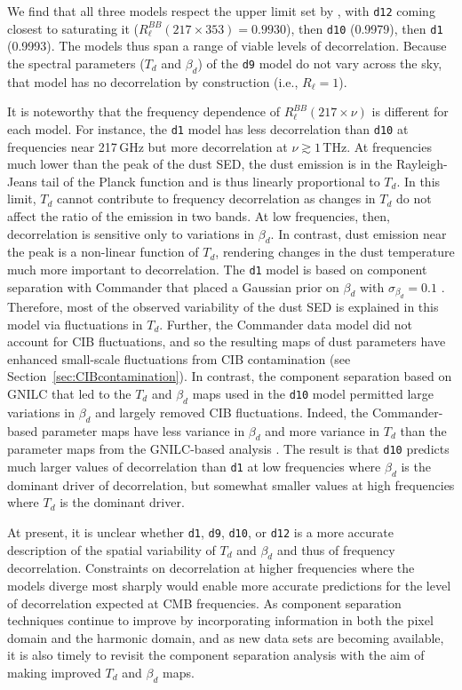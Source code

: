 \documentclass[twocolumn]{aastex631}
\begin{document}
We find that all three models respect the upper limit set by \citet{planck2016-l11A}, with \texttt{d12} coming closest to saturating it ($R_\ell^{BB}(217\times353) = 0.9930$), then \texttt{d10} (0.9979), then \texttt{d1} (0.9993). The models thus span a range of viable levels of decorrelation. Because the spectral parameters ($T_d$ and $\beta_d$) of the \texttt{d9} model do not vary across the sky, that model has no decorrelation by construction (i.e., $R_\ell = 1$).

It is noteworthy that the frequency dependence of $R_\ell^{BB}(217\times\nu)$ is different for each model. For instance, the \texttt{d1} model has less decorrelation than \texttt{d10} at frequencies near 217\,GHz but more decorrelation at $\nu \gtrsim 1$\,THz. At frequencies much lower than the peak of the dust SED, the dust emission is in the Rayleigh-Jeans tail of the Planck function and is thus linearly proportional to $T_d$. In this limit, $T_d$ cannot contribute to frequency decorrelation as changes in $T_d$ do not affect the ratio of the emission in two bands. At low frequencies, then, decorrelation is sensitive only to variations in $\beta_d$. In contrast, dust emission near the peak is a non-linear function of $T_d$, rendering changes in the dust temperature much more important to decorrelation. The \texttt{d1} model is based on component separation with Commander that placed a Gaussian prior on $\beta_d$ with $\sigma_{\beta_d} = 0.1$ \citep{planck2014-a12}. Therefore, most of the observed variability of the dust SED is explained in this model via fluctuations in $T_d$. Further, the Commander data model did not account for CIB fluctuations, and so the resulting maps of dust parameters have enhanced small-scale fluctuations from CIB contamination (see Section~\ref{sec:CIBcontamination}). In contrast, the component separation based on GNILC that led to the $T_d$ and $\beta_d$ maps used in the \texttt{d10} model \citep{planck2016-XLVIII} permitted large variations in $\beta_d$ and largely removed CIB fluctuations. Indeed, the Commander-based parameter maps have less variance in $\beta_d$ and more variance in $T_d$ than the parameter maps from the GNILC-based analysis \citep[see][Table~1]{planck2016-XLVIII}. The result is that \texttt{d10} predicts much larger values of decorrelation than \texttt{d1} at low frequencies where $\beta_d$ is the dominant driver of decorrelation, but somewhat smaller values at high frequencies where $T_d$ is the dominant driver.

At present, it is unclear whether \texttt{d1}, \texttt{d9}, \texttt{d10}, or \texttt{d12} is a more accurate description of the spatial variability of $T_d$ and $\beta_d$ and thus of frequency decorrelation. Constraints on decorrelation at higher frequencies where the models diverge most sharply would enable more accurate predictions for the level of decorrelation expected at CMB frequencies. As component separation techniques continue to improve by incorporating information in both the pixel domain and the harmonic domain, and as new data sets are becoming available, it is also timely to revisit the component separation analysis with the aim of making improved $T_d$ and $\beta_d$ maps.
\end{document}
